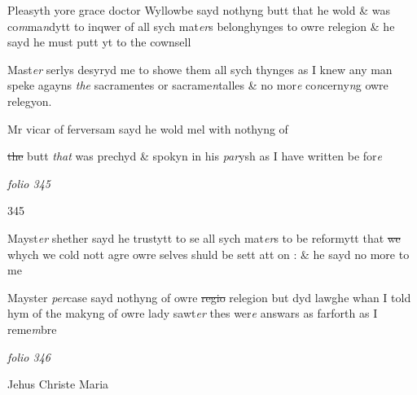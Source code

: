 \documentclass[12pt, a4paper]{book}
\begin{document}
		\ifthenelse{\isodd{\thepage}}
		{\reversemarginpar}
		{\normalmarginpar}
		Pleasyth yore grace doctor Wyllowbe sayd nothyng
butt that he wold \& was co\textit{m}ma\textit{n}dytt to inqwer
of all sych mat\textit{er}s belonghynges to owre relegion 
\& he sayd he must putt yt to the cownsell


		\ifthenelse{\isodd{\thepage}}
		{\reversemarginpar}
		{\normalmarginpar}
		Mast\textit{er} serlys desyryd me to showe them
all sych thynges as I knew any man speke 
agayns \textit{the} sacramentes or sacrame\textit{n}talles \& no
mor\textit{e} co\textit{n}cerny\textit{n}g owre relegyon.


		\ifthenelse{\isodd{\thepage}}
		{\reversemarginpar}
		{\normalmarginpar}
		Mr vicar of ferversam 
			sayd he wold mel with nothyng 
of 
			
               \sout{the }butt \textit{that }was prechyd \& spokyn in his \textit{par}ysh
as I have written be for\textit{e}
               
\dotfill
						\newpage
{}

\textit{folio 345}


\begin{flushright}{\color{Mahogany}345}\end{flushright}

		\ifthenelse{\isodd{\thepage}}
		{\reversemarginpar}
		{\normalmarginpar}
		Mayst\textit{er} shether sayd he trustytt to 
			se all
sych mat\textit{er}s to be reformytt that \sout{we}
whych we 
			cold nott 
			agre owre selves shuld be sett att on : \& he sayd no more
to me

		\ifthenelse{\isodd{\thepage}}
		{\reversemarginpar}
		{\normalmarginpar}
		Mayster \textit{per}case sayd nothyng of owre
\sout{regio }relegion but dyd lawghe whan 
I told hym of the makyng of owre 
lady sawt\textit{er} thes wer\textit{e} answars as
farforth as I reme\textit{m}bre

\dotfill
						\newpage
{}

\textit{folio 346}



		\ifthenelse{\isodd{\thepage}}
		{\reversemarginpar}
		{\normalmarginpar}
		Jehus Christe Maria
\end{document}

